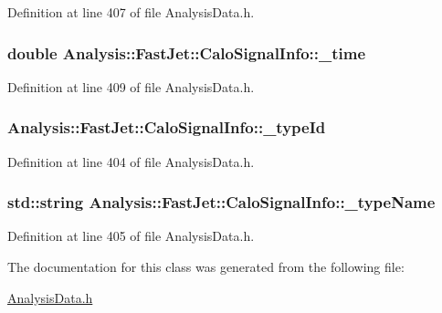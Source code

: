 Definition at line 407 of file Analysis\+Data.\+h.

\subsubsection[{\texorpdfstring{\+\_\+time}{_time}}]{\setlength{\rightskip}{0pt plus 5cm}double Analysis\+::\+Fast\+Jet\+::\+Calo\+Signal\+Info\+::\+\_\+time\hspace{0.3cm}{\ttfamily [protected]}}\hypertarget{classAnalysis_1_1FastJet_1_1CaloSignalInfo_ae6fd205bf7cf2490b9fb0f1878e0ae37}{}\label{classAnalysis_1_1FastJet_1_1CaloSignalInfo_ae6fd205bf7cf2490b9fb0f1878e0ae37}


Definition at line 409 of file Analysis\+Data.\+h.

\subsubsection[{\texorpdfstring{\+\_\+type\+Id}{_typeId}}]{ Analysis\+::\+Fast\+Jet\+::\+Calo\+Signal\+Info\+::\+\_\+type\+Id\hspace{0.3cm}{\ttfamily [protected]}}\hypertarget{classAnalysis_1_1FastJet_1_1CaloSignalInfo_ab46f3aed35f69718e0faa3b4aa4580a7}{}\label{classAnalysis_1_1FastJet_1_1CaloSignalInfo_ab46f3aed35f69718e0faa3b4aa4580a7}


Definition at line 404 of file Analysis\+Data.\+h.

\subsubsection[{\texorpdfstring{\+\_\+type\+Name}{_typeName}}]{\setlength{\rightskip}{0pt plus 5cm}std\+::string Analysis\+::\+Fast\+Jet\+::\+Calo\+Signal\+Info\+::\+\_\+type\+Name\hspace{0.3cm}{\ttfamily [protected]}}\hypertarget{classAnalysis_1_1FastJet_1_1CaloSignalInfo_ad359585157bcda1da4b08560ce2d4977}{}\label{classAnalysis_1_1FastJet_1_1CaloSignalInfo_ad359585157bcda1da4b08560ce2d4977}


Definition at line 405 of file Analysis\+Data.\+h.



The documentation for this class was generated from the following file\+:\begin{DoxyCompactItemize}
\item 
\hyperlink{AnalysisData_8h}{Analysis\+Data.\+h}\end{DoxyCompactItemize}
